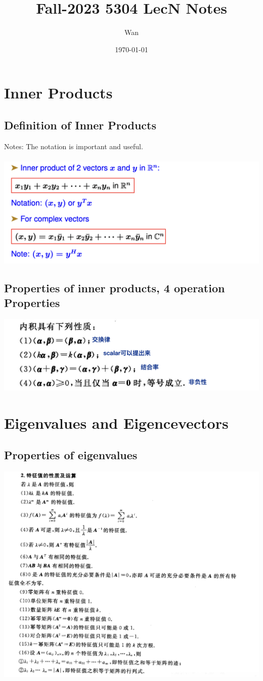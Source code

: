 \documentclass{article}
\begin{document}
\title{Fall-2023 5304 LecN Notes}
\author{Wan}
\date{\today}
\maketitle



\section{Inner Products}
\subsection*{Definition of Inner Products}
Notes: The notation is important and useful.\\
\\
\includegraphics[width=1\linewidth]{lec2-3.png}

\subsection*{Properties of inner products, 4 operation Properties}
\includegraphics[width=1\linewidth]{lec2-2.png}

\pagebreak
\section{Eigenvalues and Eigencevectors}
\subsection*{Properties of eigenvalues}
\includegraphics[width=1.5\linewidth]{lec2-1.png}
\end{document}
